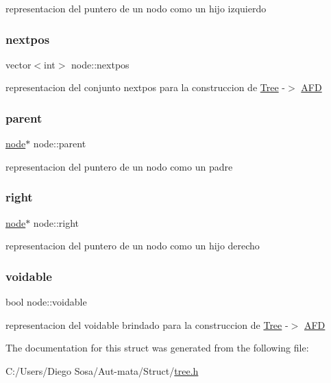 representacion del puntero de un nodo como un hijo izquierdo \hypertarget{structnode_a64dedca0efaaa687a5aef97070f82c74}{}\label{structnode_a64dedca0efaaa687a5aef97070f82c74} 
\subsubsection{\texorpdfstring{nextpos}{nextpos}}
{\footnotesize\ttfamily vector$<$int$>$ node\+::nextpos}

representacion del conjunto nextpos para la construccion de \hyperlink{class_tree}{Tree} -\/$>$ \hyperlink{class_a_f_d}{A\+FD} \hypertarget{structnode_a5e88137f1d0e2f7a940bccf4c3d3a4d3}{}\label{structnode_a5e88137f1d0e2f7a940bccf4c3d3a4d3} 
\subsubsection{\texorpdfstring{parent}{parent}}
{\footnotesize\ttfamily \hyperlink{structnode}{node}$\ast$ node\+::parent}

representacion del puntero de un nodo como un padre \hypertarget{structnode_abdc86d4c8604c481752953af3235fc47}{}\label{structnode_abdc86d4c8604c481752953af3235fc47} 
\subsubsection{\texorpdfstring{right}{right}}
{\footnotesize\ttfamily \hyperlink{structnode}{node}$\ast$ node\+::right}

representacion del puntero de un nodo como un hijo derecho \hypertarget{structnode_a660b4cccc7107b0f760220867e3bb582}{}\label{structnode_a660b4cccc7107b0f760220867e3bb582} 
\subsubsection{\texorpdfstring{voidable}{voidable}}
{\footnotesize\ttfamily bool node\+::voidable}

representacion del voidable brindado para la construccion de \hyperlink{class_tree}{Tree} -\/$>$ \hyperlink{class_a_f_d}{A\+FD} 

The documentation for this struct was generated from the following file\+:\begin{DoxyCompactItemize}
\item 
C\+:/\+Users/\+Diego Sosa/\+Aut-\/mata/\+Struct/\hyperlink{tree_8h}{tree.\+h}\end{DoxyCompactItemize}
